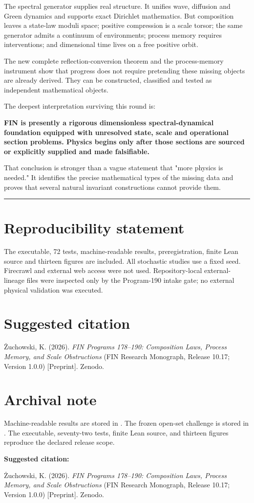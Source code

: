 \documentclass[11pt,a4paper,openany]{report}
\begin{document}
The spectral generator supplies real structure. It unifies wave, diffusion and Green dynamics and supports exact Dirichlet mathematics. But composition leaves a state-law moduli space; positive compression is a scale torsor; the same generator admits a continuum of environments; process memory requires interventions; and dimensional time lives on a free positive orbit.

The new complete reflection-conversion theorem and the process-memory instrument show that progress does not require pretending these missing objects are already derived. They can be constructed, classified and tested as independent mathematical objects.

The deepest interpretation surviving this round is:

\textbf{FIN is presently a rigorous dimensionless spectral-dynamical foundation equipped with unresolved state, scale and operational section problems. Physics begins only after those sections are sourced or explicitly supplied and made falsifiable.}

That conclusion is stronger than a vague statement that "more physics is needed." It identifies the precise mathematical types of the missing data and proves that several natural invariant constructions cannot provide them.

\par\medskip\hrule\medskip

\chapter{Reproducibility statement}

The executable, 72 tests, machine-readable results, preregistration, finite Lean source and thirteen figures are included. All stochastic studies use a fixed seed. Firecrawl and external web access were not used. Repository-local external-lineage files were inspected only by the Program-190 intake gate; no external physical validation was executed.

\chapter{Suggested citation}

\.Zuchowski, K. (2026). \emph{FIN Programs 178--190: Composition Laws, Process Memory, and Scale Obstructions} (FIN Research Monograph, Release 10.17; Version 1.0.0) [Preprint]. Zenodo.


\clearpage
\chapter*{Archival note}
Machine-readable results are stored in
.
The frozen open-set challenge is stored in
.
The executable, seventy-two tests, finite Lean source, and thirteen figures
reproduce the declared release scope.

\medskip
\noindent\textbf{Suggested citation:}

\.Zuchowski, K. (2026). \emph{FIN Programs 178--190: Composition Laws,
Process Memory, and Scale Obstructions}
(FIN Research Monograph, Release 10.17; Version 1.0.0) [Preprint]. Zenodo.
\end{document}
